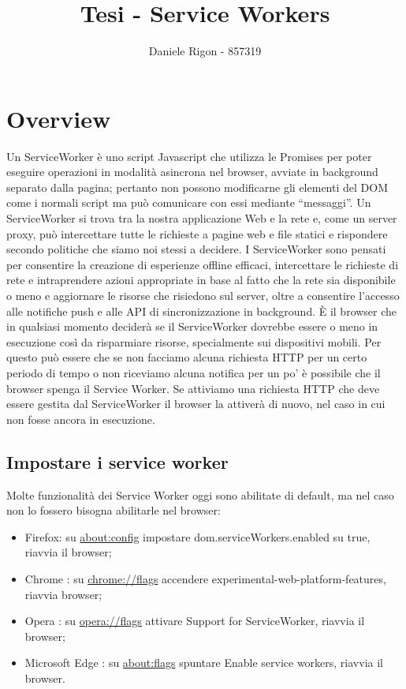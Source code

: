 \documentclass[11pt ,a4paper , twoside , openright ]{article}
\author{
	Daniele Rigon - 857319 \\
}
\begin{document}
\title{Tesi - Service Workers}
\maketitle

\tableofcontents
\pagebreak

\section{Overview}
Un ServiceWorker è uno script Javascript che utilizza le Promises per poter eseguire operazioni in modalità asincrona nel browser, avviate in background separato dalla pagina; pertanto non possono modificarne gli elementi del DOM come i normali script ma può comunicare con essi mediante “messaggi”.
Un ServiceWorker si trova tra la nostra applicazione Web e la rete e, come un server proxy, può intercettare tutte le richieste a pagine web e file statici e rispondere secondo politiche che siamo noi stessi a decidere.
I ServiceWorker sono pensati per consentire la creazione di esperienze offline efficaci, intercettare le richieste di rete e intraprendere azioni appropriate in base al fatto che la rete sia disponibile o meno e aggiornare le risorse che risiedono sul server, oltre a consentire l'accesso alle notifiche push e alle API di sincronizzazione in background.
È il browser che in qualsiasi momento deciderà se il ServiceWorker dovrebbe essere o meno in esecuzione così da risparmiare risorse, specialmente sui dispositivi mobili. Per questo può essere che se non facciamo alcuna richiesta HTTP per un certo periodo di tempo o non riceviamo alcuna notifica per un po' è possibile che il browser spenga il Service Worker. Se attiviamo una richiesta HTTP che deve essere gestita dal ServiceWorker il browser la attiverà di nuovo, nel caso in cui non fosse ancora in esecuzione. 

\subsection{Impostare i service worker}
Molte funzionalità dei Service Worker oggi sono abilitate di default, ma nel caso non lo fossero bisogna abilitarle nel browser:
\begin{itemize}
	\item Firefox: su \url{about:config} impostare dom.serviceWorkers.enabled su true, riavvia il browser;
	\item Chrome : su \url{chrome://flags} accendere  experimental-web-platform-features, riavvia browser;
	\item Opera : su \url{opera://flags} attivare Support for ServiceWorker, riavvia il browser;
	\item Microsoft Edge : su \url{about:flags} spuntare  Enable service workers, riavvia il browser.
\end{itemize}
\end{document}
